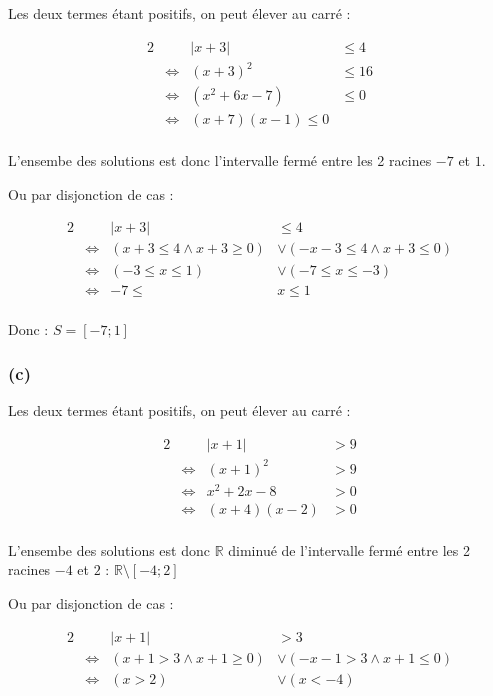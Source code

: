 \documentclass[a4paper,10pt]{report}
\begin{document}
Les deux termes étant positifs, on peut élever au carré :

\begin{alignat*}{2}
	&                    & |x+3| &\leq 4 \\
	&\Longleftrightarrow &(x+3)^2 &\leq 16 \\
	&\Longleftrightarrow & (x^2 + 6x -7) & \leq 0 \\
	&\Longleftrightarrow & (x+7)(x-1) \leq 0\\
\end{alignat*}

L'ensembe des solutions est donc l'intervalle fermé entre les 2 racines $-7$ et $1$.

Ou par disjonction de cas :

\begin{alignat*}{2}
	&                    & |x+3| &\leq 4 \\
	&\Longleftrightarrow &(x+3\leq 4 \wedge x+3 \geq 0) &\vee (-x-3\leq 4 \wedge x+3 \leq 0) \\
	&\Longleftrightarrow & (-3 \leq x \leq 1) &\vee (-7 \leq x \leq -3) \\
	&\Longleftrightarrow & -7 \leq &x \leq 1 \\
\end{alignat*}

Donc : $S=[-7 ; 1]$

\subsubsection*{(c)}


Les deux termes étant positifs, on peut élever au carré :

\begin{alignat*}{2}
	&                    & |x+1| &> 9 \\
	&\Longleftrightarrow &(x+1)^2 &> 9 \\
	&\Longleftrightarrow & x^2 + 2x -8 & >0 \\
	&\Longleftrightarrow & (x+4)(x-2) &> 0\\
\end{alignat*}

L'ensembe des solutions est donc $\mathbb{R}$ diminué de l'intervalle fermé entre les 2 racines $-4$ et $2$ : $\mathbb{R} \setminus [-4 ; 2]$

Ou par disjonction de cas :

\begin{alignat*}{2}
	&                    & |x+1| &>3  \\
	&\Longleftrightarrow &(x+1 > 3 \wedge x+1 \geq 0) &\vee (-x-1 >3 \wedge x+1 \leq 0) \\
	&\Longleftrightarrow & (x > 2) &\vee (x < -4)
\end{alignat*}
\end{document}

